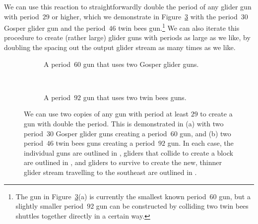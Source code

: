 We can use this reaction to straightforwardly double the period of any glider gun with period~$29$ or higher, which we demonstrate in Figure~\ref{fig:guns_doubled_period} with the period~$30$ Gosper glider gun and the period~$46$ twin bees gun.\footnote{The gun in Figure~\ref{fig:guns_doubled_period}(a) is currently the smallest known period~$60$ gun, but a slightly smaller period~$92$ gun can be constructed by colliding two twin bees shuttles together directly in a certain way.} We can also iterate this procedure to create (rather large) glider guns with periods as large as we like, by doubling the spacing out the output glider stream as many times as we like.
\begin{figure}[!htb]
	\centering
	\begin{subfigure}{.48\textwidth}
		\centering
		\caption{A period~$60$ gun that uses two Gosper glider guns.}
		\label{fig:p60_gun}
	\end{subfigure} \ \ \ \ %
	\begin{subfigure}{.48\textwidth}
		\centering
		\caption{A period~$92$ gun that uses two twin bees guns.}
		\label{fig:p92_gun}
	\end{subfigure}
	\caption{We can use two copies of any gun with period at least $29$ to create a gun with double the period. This is demonstrated in (a) with two period~$30$ Gosper glider guns creating a period~$60$ gun, and (b) two period~$46$ twin bees guns creating a period~$92$ gun. In each case, the individual guns are outlined in , gliders that collide to create a block are outlined in , and gliders to survive to create the new, thinner glider stream travelling to the southeast are outlined in .}\label{fig:guns_doubled_period}
\end{figure}

